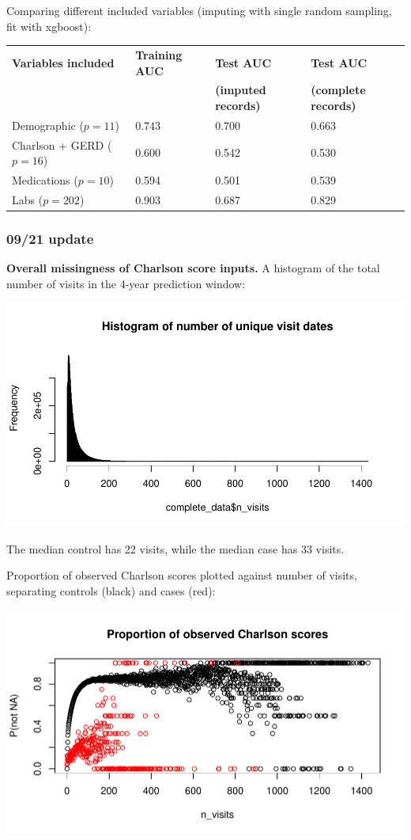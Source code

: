 \documentclass[12pt]{article}
\begin{document}
Comparing different included variables (imputing with single random sampling, fit with xgboost):
\begin{center}
\begin{tabular}{|l|l|l|l|}
\hline
\textbf{Variables included} & \textbf{Training AUC} & \textbf{Test AUC} & \textbf{Test AUC} \\
 & & \textbf{(imputed records)} & \textbf{(complete records)} \\ \hline
Demographic ($p=11$) & 0.743 & 0.700 & 0.663 \\ \hline
Charlson + GERD ($p=16$) & 0.600 & 0.542 & 0.530 \\ \hline
Medications ($p=10$) & 0.594 & 0.501 & 0.539 \\ \hline
Labs ($p=202$) & 0.903 & 0.687 & 0.829 \\ \hline
\end{tabular}
\end{center}

%

\pagebreak

\subsubsection*{09/21 update}

{\bf Overall missingness of Charlson score inputs.} A histogram of the total number of visits in the 4-year prediction window:

\begin{center}
\includegraphics[width=.7\textwidth]{nvisits_hist.pdf}
\end{center}

The median control has 22 visits, while the median case has 33 visits.

Proportion of observed Charlson scores plotted against number of visits, separating controls (black) and cases (red):

\begin{center}
\includegraphics[width=.6\textwidth]{nvisits_scatter.pdf}
\end{center}
\end{document}
